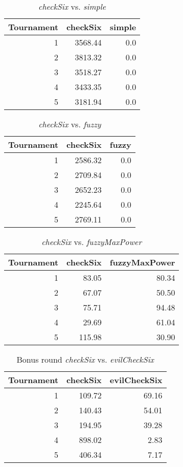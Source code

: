 \begin{table}[H]
\centering
\caption{\emph{checkSix} vs. \emph{simple}}
\label{checkSix vs. simple}
\begin{tabular}{r|r|r}
Tournament	& checkSix	& simple	\\ \hline
1			& 3568.44	& 0.0		\\
2			& 3813.32	& 0.0		\\
3			& 3518.27	& 0.0		\\
4			& 3433.35	& 0.0		\\
5			& 3181.94	& 0.0
\end{tabular}
\end{table}

\begin{table}[H]
\centering
\caption{\emph{checkSix} vs. \emph{fuzzy}}
\label{checkSix vs. fuzzy}
\begin{tabular}{r|r|r}
Tournament	& checkSix	& fuzzy	\\ \hline
1			& 2586.32	& 0.0	\\
2			& 2709.84	& 0.0	\\
3			& 2652.23	& 0.0	\\
4			& 2245.64	& 0.0	\\
5			& 2769.11	& 0.0
\end{tabular}
\end{table}

\begin{table}[H]
\centering
\caption{\emph{checkSix} vs. \emph{fuzzyMaxPower}}
\label{checkSix vs. fuzzyMaxPower}
\begin{tabular}{r|r|r}
Tournament	& checkSix	& fuzzyMaxPower	\\ \hline
1			& 83.05		& 80.34			\\
2			& 67.07		& 50.50			\\
3			& 75.71		& 94.48			\\
4			& 29.69		& 61.04			\\
5			& 115.98	& 30.90
\end{tabular}
\end{table}

\begin{table}[H]
\centering
\caption{Bonus round \emph{checkSix} vs. \emph{evilCheckSix}}
\label{Bonus round checkSix vs. evilCheckSix}
\begin{tabular}{r|r|r}
Tournament	& checkSix	& evilCheckSix	\\ \hline
1			& 109.72	& 69.16			\\
2			& 140.43	& 54.01			\\
3			& 194.95	& 39.28			\\
4			& 898.02	& 2.83			\\
5			& 406.34	& 7.17
\end{tabular}
\end{table}